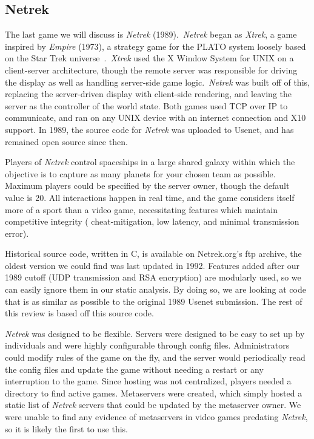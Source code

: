 \subsection{Netrek}\label{subsec:netrek}

The last game we will discuss is \textit{Netrek} (1989).\ \textit{Netrek} began as \textit{Xtrek}, a game inspired by \textit{Empire} (1973), a strategy game for the PLATO system loosely based on the Star Trek universe~\cite{netrekhist}.\ \textit{Xtrek} used the X Window System for UNIX on a client-server architecture, though the remote server was responsible for driving the display as well as handling server-side game logic.\ \textit{Netrek} was built off of this, replacing the server-driven display with client-side rendering, and leaving the server as the controller of the world state. Both games used TCP over IP to communicate, and ran on any UNIX device with an internet connection and X10 support. In 1989, the source code for \textit{Netrek} was uploaded to Usenet, and has remained open source since then.

Players of \textit{Netrek} control spaceships in a large shared galaxy within which the objective is to capture as many planets for your chosen team as possible. Maximum players could be specified by the server owner, though the default value is 20. All interactions happen in real time, and the game considers itself more of a sport than a video game, necessitating features which maintain competitive integrity (\eg{} cheat-mitigation, low latency, and minimal transmission error).

Historical source code, written in C, is available on Netrek.org's ftp archive, the oldest version we could find was last updated in 1992. Features added after our 1989 cutoff (UDP transmission and RSA encryption) are modularly used, so we can easily ignore them in our static analysis. By doing so, we are looking at code that is as similar as possible to the original 1989 Usenet submission. The rest of this review is based off this source code.

\textit{Netrek} was designed to be flexible. Servers were designed to be easy to set up by individuals and were highly configurable through config files. Administrators could modify rules of the game on the fly, and the server would periodically read the config files and update the game without needing a restart or any interruption to the game. Since hosting was not centralized, players needed a directory to find active games. Metaservers were created, which simply hosted a static list of \textit{Netrek} servers that could be updated by the metaserver owner. We were unable to find any evidence of metaservers in video games predating \textit{Netrek}, so it is likely the first to use this.

